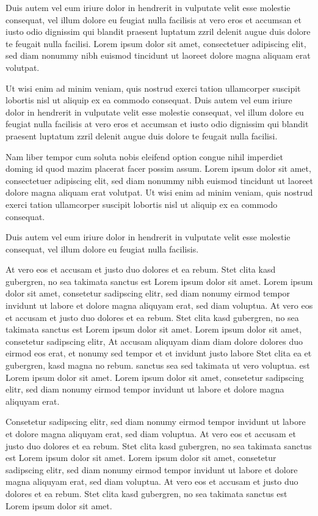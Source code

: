 \documentclass[twoside,a4paper]{article}
\begin{document}
Duis autem vel eum iriure dolor in hendrerit in vulputate velit esse molestie
consequat, vel illum dolore eu feugiat nulla facilisis at vero eros et accumsan
et iusto odio dignissim qui blandit praesent luptatum zzril delenit augue duis
dolore te feugait nulla facilisi. Lorem ipsum dolor sit amet, consectetuer
adipiscing elit, sed diam nonummy nibh euismod tincidunt ut laoreet dolore
magna aliquam erat volutpat.

Ut wisi enim ad minim veniam, quis nostrud exerci tation ullamcorper suscipit
lobortis nisl ut aliquip ex ea commodo consequat. Duis autem vel eum iriure
dolor in hendrerit in vulputate velit esse molestie consequat, vel illum dolore
eu feugiat nulla facilisis at vero eros et accumsan et iusto odio dignissim qui
blandit praesent luptatum zzril delenit augue duis dolore te feugait nulla
facilisi.

Nam liber tempor cum soluta nobis eleifend option congue nihil imperdiet doming
id quod mazim placerat facer possim assum. Lorem ipsum dolor sit amet,
consectetuer adipiscing elit, sed diam nonummy nibh euismod tincidunt ut
laoreet dolore magna aliquam erat volutpat. Ut wisi enim ad minim veniam, quis
nostrud exerci tation ullamcorper suscipit lobortis nisl ut aliquip ex ea
commodo consequat.

Duis autem vel eum iriure dolor in hendrerit in vulputate velit esse molestie
consequat, vel illum dolore eu feugiat nulla facilisis.

At vero eos et accusam et justo duo dolores et ea rebum. Stet clita kasd
gubergren, no sea takimata sanctus est Lorem ipsum dolor sit amet. Lorem ipsum
dolor sit amet, consetetur sadipscing elitr, sed diam nonumy eirmod tempor
invidunt ut labore et dolore magna aliquyam erat, sed diam voluptua. At vero
eos et accusam et justo duo dolores et ea rebum. Stet clita kasd gubergren, no
sea takimata sanctus est Lorem ipsum dolor sit amet. Lorem ipsum dolor sit amet,
consetetur sadipscing elitr, At accusam aliquyam diam diam dolore dolores duo
eirmod eos erat, et nonumy sed tempor et et invidunt justo labore Stet clita ea
et gubergren, kasd magna no rebum. sanctus sea sed takimata ut vero voluptua.
est Lorem ipsum dolor sit amet. Lorem ipsum dolor sit amet, consetetur
sadipscing elitr, sed diam nonumy eirmod tempor invidunt ut labore et dolore
magna aliquyam erat.

Consetetur sadipscing elitr, sed diam nonumy eirmod tempor invidunt ut labore
et dolore magna aliquyam erat, sed diam voluptua. At vero eos et accusam et
justo duo dolores et ea rebum. Stet clita kasd gubergren, no sea takimata
sanctus est Lorem ipsum dolor sit amet. Lorem ipsum dolor sit amet, consetetur
sadipscing elitr, sed diam nonumy eirmod tempor invidunt ut labore et dolore
magna aliquyam erat, sed diam voluptua. At vero eos et accusam et justo duo
dolores et ea rebum. Stet clita kasd gubergren, no sea takimata sanctus est
Lorem ipsum dolor sit amet.
\end{document}
